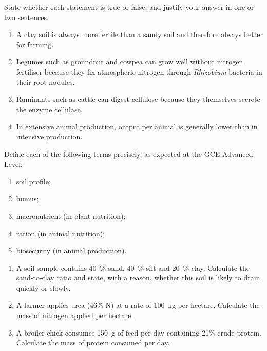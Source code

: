 \documentclass[11pt]{article}
\begin{document}
\begin{exercice}
State whether each statement is true or false, and justify your answer in one or two sentences.
\begin{enumerate}
\item A clay soil is always more fertile than a sandy soil and therefore always better for farming.
\item Legumes such as groundnut and cowpea can grow well without nitrogen fertiliser because they fix atmospheric nitrogen through \emph{Rhizobium} bacteria in their root nodules.
\item Ruminants such as cattle can digest cellulose because they themselves secrete the enzyme cellulase.
\item In extensive animal production, output per animal is generally lower than in intensive production.
\end{enumerate}
\end{exercice}

\begin{exercice}[Definitions]
Define each of the following terms precisely, as expected at the GCE Advanced Level:
\begin{enumerate}
\item soil profile;
\item humus;
\item macronutrient (in plant nutrition);
\item ration (in animal nutrition);
\item biosecurity (in animal production).
\end{enumerate}
\end{exercice}

\begin{exercice}
\begin{enumerate}
\item A soil sample contains \SI{40}{\percent} sand, \SI{40}{\percent} silt and \SI{20}{\percent} clay. Calculate the sand-to-clay ratio and state, with a reason, whether this soil is likely to drain quickly or slowly.
\item A farmer applies urea (46\% N) at a rate of \SI{100}{kg} per hectare. Calculate the mass of nitrogen applied per hectare.
\item A broiler chick consumes \SI{150}{g} of feed per day containing 21\% crude protein. Calculate the mass of protein consumed per day.
\end{enumerate}
\end{exercice}
\end{document}
